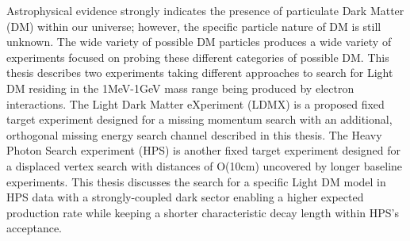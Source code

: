 Astrophysical evidence strongly indicates the presence of particulate Dark Matter (DM) within our universe; however, the specific particle nature of DM is still unknown. The wide variety of possible DM particles produces a wide variety of experiments focused on probing these different categories of possible DM. This thesis describes two experiments taking different approaches to search for Light DM residing in the 1MeV-1GeV mass range being produced by electron interactions. The Light Dark Matter eXperiment (LDMX) is a proposed fixed target experiment designed for a missing momentum search with an additional, orthogonal missing energy search channel described in this thesis. The Heavy Photon Search experiment (HPS) is another fixed target experiment designed for a displaced vertex search with distances of O(10cm) uncovered by longer baseline experiments. This thesis discusses the search for a specific Light DM model in HPS data with a strongly-coupled dark sector enabling a higher expected production rate while keeping a shorter characteristic decay length within HPS's acceptance.
